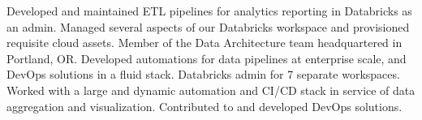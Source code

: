 \documentclass[
  a4paper, 
]{FormatDetails}
\begin{document}
\begin{cvtable}
    {Developed and maintained ETL pipelines for analytics reporting in Databricks as an admin. Managed several aspects of our Databricks workspace and provisioned requisite cloud assets.}
    \vspace{2mm}
    {Member of the Data Architecture team headquartered in Portland, OR. Developed automations for data pipelines at enterprise scale, and DevOps solutions in a fluid stack. Databricks admin for 7 separate workspaces.}
    \vspace{2mm}
    {Worked with a large and dynamic automation and CI/CD stack in service of data aggregation and visualization. Contributed to and developed DevOps solutions.}
    \vspace{2mm}

\end{cvtable}
\end{document}
